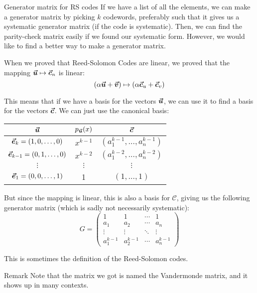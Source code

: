 \documentclass[a4paper]{article}
\begin{document}
\begin{parag}{Generator matrix for RS codes}
    If we have a list of all the elements, we can make a generator matrix by picking $k$ codewords, preferably such that it gives us a systematic generator matrix (if the code is systematic). Then, we can find the parity-check matrix easily if we found our systematic form. However, we would like to find a better way to make a generator matrix.

    When we proved that Reed-Solomon Codes are linear, we proved that the mapping $\bm{\protect\vec{u}} \mapsto \bm{\protect\vec{c}}_n$ is linear: 
    \[\left(\alpha \bvec{u} + \bvec{v}\right) \mapsto \left(\alpha \bvec{c}_u + \bvec{c}_v\right)\]
    
    This means that if we have a basis for the vectors $\bm{\protect\vec{u}}$, we can use it to find a basis for the vectors $\bm{\protect\vec{c}}$. We can just use the canonical basis:
    \begin{center}
    \begin{tabular}{c|c|c}
        $\bm{\protect\vec{u}}$ & $p_{\bvec{u}}\left(x\right)$ & $\bm{\protect\vec{c}}$ \\
        \hline
        $\bvec{e}_{k} = \left(1, 0, \ldots, 0\right)$ & $x^{k-1}$ & $\left(a_1^{k-1}, \ldots, a_n^{k-1}\right)$  \\
        $\bvec{e}_{k-1} = \left(0, 1, \ldots, 0\right)$ & $x^{k-2}$ & $\left(a_1^{k-2}, \ldots, a_{n}^{k-2}\right)$  \\
        $\vdots$ & $\vdots$ & $\vdots$ \\
        $\bvec{e}_1 = \left(0, 0, \ldots, 1\right)$ & 1 & $\left(1, \ldots, 1\right)$
    \end{tabular}
    \end{center}
    
    But since the mapping is linear, this is also a basis for $\mathcal{C}$, giving us the following generator matrix (which is sadly not necessarily systematic):  
    \[G = \begin{pmatrix} 1 & 1 & \cdots & 1 \\ a_1 & a_2 & \cdots & a_n \\ \vdots & \vdots & \ddots & \vdots \\ a_{1}^{k-1} & a_2^{k-1} & \cdots & a_n^{k-1} \end{pmatrix} \]
    
    This is sometimes the definition of the Reed-Solomon codes.

    \begin{subparag}{Remark}
        Note that the matrix we got is named the Vandermonde matrix, and it shows up in many contexts.
    \end{subparag}
\end{parag}
\end{document}
